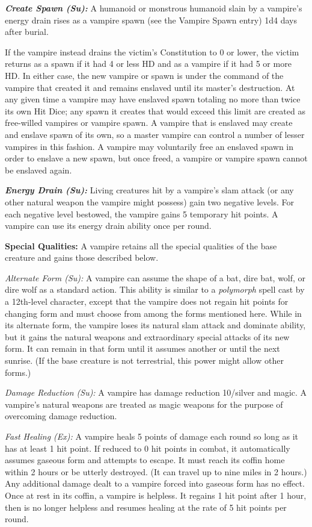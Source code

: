 \documentclass{article}
\begin{document}
\textit{\textbf{Create Spawn (Su):}}\textit{ }A humanoid or monstrous humanoid 
slain by a vampire's energy drain rises as a vampire spawn (see the Vampire Spawn 
entry) 1d4 days after burial. 

If the vampire instead drains the victim's Constitution to 0 or lower, the victim 
returns as a spawn if it had 4 or less HD and as a vampire if it had 5 or more 
HD. In either case, the new vampire or spawn is under the command of the vampire 
that created it and remains enslaved until its master's destruction. At any given 
time a vampire may have enslaved spawn totaling no more than twice its own Hit 
Dice; any spawn it creates that would exceed this limit are created as free-willed 
vampires or vampire spawn. A vampire that is enslaved may create and enslave spawn 
of its own, so a master vampire can control a number of lesser vampires in this 
fashion. A vampire may voluntarily free an enslaved spawn in order to enslave a 
new spawn, but once freed, a vampire or vampire spawn cannot be enslaved again.

\textit{\textbf{Energy Drain (Su):}}\textit{ }Living creatures hit by a vampire's 
slam attack (or any other natural weapon the vampire might possess) gain two negative 
levels. For each negative level bestowed, the vampire gains 5 temporary hit points. 
A vampire can use its energy drain ability once per round.

\textbf{Special Qualities:} A vampire retains all the special qualities of the 
base creature and gains those described below.

\textit{Alternate Form (Su): }A vampire can assume the shape of a bat, dire bat, 
wolf, or dire wolf as a standard action. This ability is similar to a \textit{polymorph 
}spell cast by a 12th-level character, except that the vampire does not regain 
hit points for changing form and must choose from among the forms mentioned here. 
While in its alternate form, the vampire loses its natural slam attack and dominate 
ability, but it gains the natural weapons and extraordinary special attacks of 
its new form. It can remain in that form until it assumes another or until the 
next sunrise. (If the base creature is not terrestrial, this power might allow 
other forms.)

\textit{Damage Reduction (Su): }A vampire has damage reduction 10/silver and magic. 
A vampire's natural weapons are treated as magic weapons for the purpose of overcoming 
damage reduction.

\textit{Fast Healing (Ex): }A vampire heals 5 points of damage each round so long 
as it has at least 1 hit point. If reduced to 0 hit points in combat, it automatically 
assumes gaseous form and attempts to escape. It must reach its coffin home within 
2 hours or be utterly destroyed. (It can travel up to nine miles in 2 hours.) Any 
additional damage dealt to a vampire forced into gaseous form has no effect. Once 
at rest in its coffin, a vampire is helpless. It regains 1 hit point after 1 hour, 
then is no longer helpless and resumes healing at the rate of 5 hit points per 
round.
\end{document}

